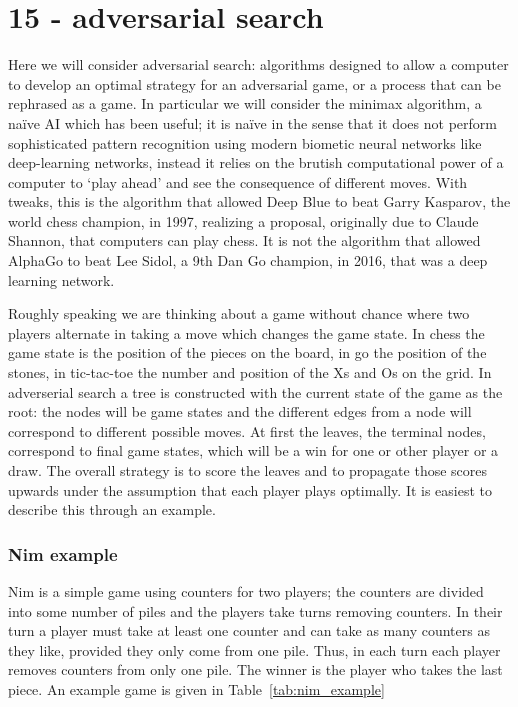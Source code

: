 \documentclass[11pt,a4paper]{scrartcl}
\begin{document}
\section*{15 - adversarial search}

Here we will consider adversarial search: algorithms designed to allow
a computer to develop an optimal strategy for an adversarial game, or
a process that can be rephrased as a game. In particular we will
consider the minimax algorithm, a na\"ive AI which has been useful; it
is na\"{i}ve in the sense that it does not perform sophisticated
pattern recognition using modern biometic neural networks like
deep-learning networks, instead it relies on the brutish computational
power of a computer to \lq{}play ahead\rq{} and see the consequence of
different moves. With tweaks, this is the algorithm that allowed Deep
Blue to beat Garry Kasparov, the world chess champion, in 1997,
realizing a proposal, originally due to Claude Shannon, that computers
can play chess. It is not the algorithm that allowed AlphaGo to beat
Lee Sidol, a 9th Dan Go champion, in 2016, that was a deep learning
network.

Roughly speaking we are thinking about a game without chance where two
players alternate in taking a move which changes the game state. In
chess the game state is the position of the pieces on the board, in go
the position of the stones, in tic-tac-toe the number and position of
the Xs and Os on the grid. In adverserial search a tree is constructed
with the current state of the game as the root: the nodes will be game
states and the different edges from a node will correspond to
different possible moves. At first the leaves, the terminal nodes,
correspond to final game states, which will be a win for one or other
player or a draw. The overall strategy is to score the leaves and to
propagate those scores upwards under the assumption that each player
plays optimally. It is easiest to describe this through an example. 

\subsubsection*{Nim example}

Nim is a simple game using counters for two players; the counters are
divided into some number of piles and the players take turns removing
counters. In their turn a player must take at least one counter and can take
as many counters as they like, provided they only come from one
pile. Thus, in each turn each player removes counters from only one
pile. The winner is the player who takes the last piece. An example
game is given in Table~\ref{tab:nim_example}
\end{document}

